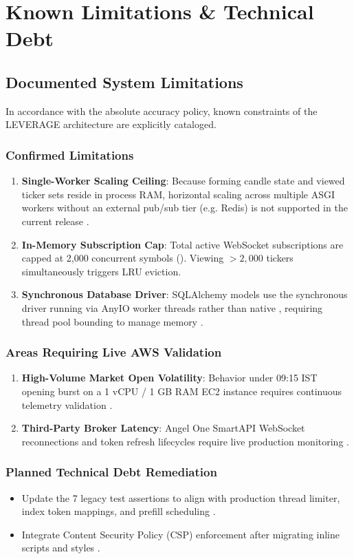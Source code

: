 \chapter{Known Limitations \& Technical Debt}
\label{ch:limitations_debt}

\section{Documented System Limitations}
In accordance with the absolute accuracy policy, known constraints of the LEVERAGE architecture are explicitly cataloged.

\subsection{Confirmed Limitations}
\begin{enumerate}[leftmargin=6mm,itemsep=1.5mm]
    \item \textbf{Single-Worker Scaling Ceiling}: Because forming candle state and viewed ticker sets reside in process RAM, horizontal scaling across multiple ASGI workers without an external pub/sub tier (e.g. Redis) is not supported in the current release .
    \item \textbf{In-Memory Subscription Cap}: Total active WebSocket subscriptions are capped at 2,000 concurrent symbols (). Viewing $>2,000$ tickers simultaneously triggers LRU eviction.
    \item \textbf{Synchronous Database Driver}: SQLAlchemy models use the synchronous  driver running via AnyIO worker threads rather than native , requiring thread pool bounding to manage memory .
\end{enumerate}

\subsection{Areas Requiring Live AWS Validation}
\begin{enumerate}[leftmargin=6mm,itemsep=1.5mm]
    \item \textbf{High-Volume Market Open Volatility}: Behavior under 09:15 IST opening burst on a 1 vCPU / 1 GB RAM EC2 instance requires continuous telemetry validation .
    \item \textbf{Third-Party Broker Latency}: Angel One SmartAPI WebSocket reconnections and token refresh lifecycles require live production monitoring .
\end{enumerate}

\subsection{Planned Technical Debt Remediation}
\begin{itemize}[leftmargin=6mm,itemsep=1.5mm]
    \item Update the 7 legacy test assertions to align with production thread limiter, index token mappings, and prefill scheduling .
    \item Integrate Content Security Policy (CSP) enforcement after migrating inline scripts and styles .
\end{itemize}
